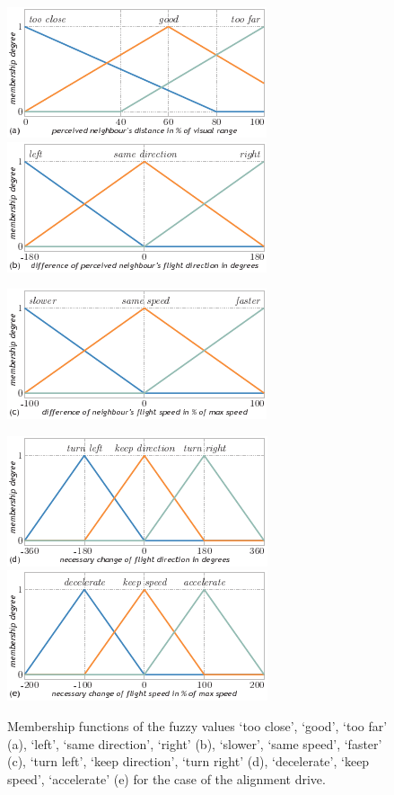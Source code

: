 \begin{figure}%
\null\vspace*{2mm}\par
\includegraphics{fig[alignment]a}\hspace*{2mm}\includegraphics{fig[alignment]b}
\par\vspace*{2mm}
\includegraphics{fig[alignment]c}
\par\vspace*{2mm}
\includegraphics{fig[alignment]d}\hspace*{2mm}\includegraphics{fig[alignment]e}
\par\vspace*{2mm}
\caption{Membership functions of the fuzzy values `too close', `good', `too far' (a), `left', `same direction', `right' (b), `slower', `same speed', `faster' (c), `turn left', `keep direction', `turn right' (d), `decelerate', `keep speed', `accelerate' (e) for the case of the alignment drive.}
\label{fig:fuzzyAnimat:Dp:afd}
\end{figure}


